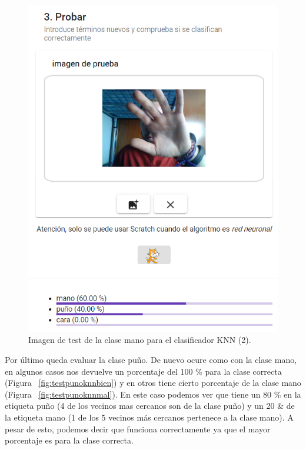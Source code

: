 \documentclass[a4paper, 12pt]{book}
\begin{document}
\begin{figure}
	\centering
	\includegraphics[width=12cm, keepaspectratio]{img/testmanoknnmal}
	\caption{Imagen de test de la clase mano para el clasificador KNN (2).}			
	\label{fig:testmanoknnmal}
\end{figure}

Por último queda evaluar la clase puño. De nuevo ocure como con la clase mano, en algunos casos nos devuelve un porcentaje del 100 \% para la clase correcta (Figura ~\ref{fig:testpunoknnbien}) y en otros tiene cierto porcentaje de la clase mano (Figura ~\ref{fig:testpunoknnmal}). En este caso podemos ver que tiene un 80 \% en la etiqueta puño (4 de los vecinos mas cercanos son de la clase puño) y un 20 \& de la etiqueta mano (1 de los 5 vecinos más cercanos pertenece a la clase mano). A pesar de esto, podemos decir que funciona correctamente ya que el mayor porcentaje es para la clase correcta.
\end{document}
